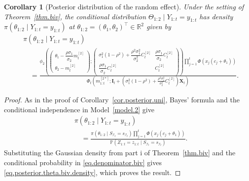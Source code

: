 \documentclass[11pt,authoryear]{elsarticle}
\def\Real{\mathbb{R}}
\def\P#1{{\mathbb{P}}\left(#1\right)}
\newtheorem{corollary}{Corollary}
\theoremstyle{nopunct}
\numberwithin{equation}{section}
\begin{document}
\begin{corollary}[Posterior distribution of the random effect]
\label{cor.61}
Under the setting of Theorem~\ref{thm.biv}, the conditional distribution
\(
\Theta_{1:2}\mid Y_{1:t}=y_{1:t}
\)
has density
\(\pi(\theta_{1:2}\mid Y_{1:t}=y_{1:t})\) at
\(
\theta_{1:2}=(\theta_1,\theta_2)^\top\in\Real^2
\)
given by
\begin{equation}
\label{eq.posterior.theta.biv.density}
\begin{aligned}
&\pi(\theta_{1:2}\mid Y_{1:t}=y_{1:t})\\
&\quad=
\frac{
\displaystyle
\phi_2
\left(
\begin{pmatrix}
\theta_1-\dfrac{\rho\sigma_1}{\sigma_2}m_t^{[2]}\\[0.2cm]
\theta_2-m_t^{[2]}
\end{pmatrix};
\begin{pmatrix}
\sigma_1^2(1-\rho^2)
+
\dfrac{\rho^2\sigma_1^2}{\sigma_2^2}C_t^{[2]}
&
\dfrac{\rho\sigma_1}{\sigma_2}C_t^{[2]}\\[0.3cm]
\dfrac{\rho\sigma_1}{\sigma_2}C_t^{[2]}
&
C_t^{[2]}
\end{pmatrix}
\right)
\displaystyle\prod_{j=1}^t
\Phi\left(
x_j(c_j+\theta_1)
\right)
}{
\displaystyle
\Phi_t
\left(
m_{1:t}^{[2*]};
\boldsymbol I_t
+
\left(
\sigma_1^2(1-\rho^2)
+
\frac{\rho^2\sigma_1^2}{\sigma_2^2}C_t^{[2]}
\right)
\boldsymbol X_t
\right)
}.
\end{aligned}
\end{equation}
\end{corollary}

\begin{proof}
As in the proof of Corollary~\ref{cor.posterior.uni},
Bayes' formula and the conditional independence in
Model~\ref{model.2} give
\[
\begin{aligned}
&\pi(
\theta_{1:2}
\mid
Y_{1:t}=y_{1:t}
)\\
&\quad=
\frac{
\pi(
\theta_{1:2}
\mid
S_{\mathcal I_t}=s_{\mathcal I_t}
)
\displaystyle\prod_{j=1}^t
\Phi\left(
x_j(c_j+\theta_1)
\right)
}{
\P{
Z_{1:t}=z_{1:t}
\mid
S_{\mathcal I_t}=s_{\mathcal I_t}
}
}.
\end{aligned}
\]
Substituting the Gaussian density from part i of
Theorem~\ref{thm.biv} and the conditional probability in
\eqref{eq.denominator.biv} gives
\eqref{eq.posterior.theta.biv.density}, which proves the result.
\end{proof}
\end{document}
